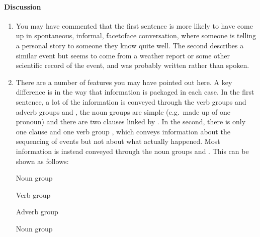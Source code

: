 \documentclass[letterpaper,10pt,english]{sphinxmanual}
\begin{document}
\paragraph{Discussion}
\label{\detokenize{content/session_00/Part_00_07:Discussion}}\begin{enumerate}
%
\item {} 
You may have commented that the first sentence is more likely to have come up in spontaneous, informal, face\sphinxhyphen{}to\sphinxhyphen{}face conversation, where someone is telling a personal story to someone they know quite well. The second describes a similar event but seems to come from a weather report or some other scientific record of the event, and was probably written rather than spoken.

\item {} 
There are a number of features you may have pointed out here. A key difference is in the way that information is packaged in each case. In the first sentence, a lot of the information is conveyed through the verb groups and adverb groups  and , the noun groups are simple (e.g. made up of one pronoun) and there are two clauses linked by . In the second, there is only one clause and one verb group , which conveys information
about the sequencing of events but not about what actually happened. Most information is instead conveyed through the noun groups  and . This can be shown as follows:













Noun group





Verb group





Adverb group













Noun group






\end{enumerate}
\end{document}
